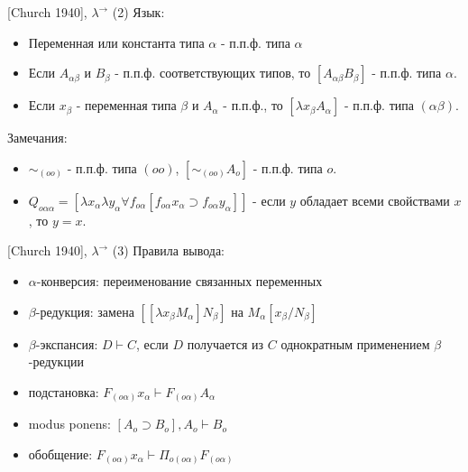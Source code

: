 \documentclass{beamer}
\begin{document}
\begin{frame}{[Church 1940], $\lambda^\to$ (2)}
Язык:\\
\bigskip
\begin{itemize}
  \item Переменная или константа типа $\alpha$ - п.п.ф. типа $\alpha$ 
  \item Если $A_{\alpha\beta}$ и $B_{\beta}$ - п.п.ф. соответствующих типов, то $[A_{\alpha\beta}B_\beta]$ - п.п.ф. типа $\alpha$.
  \item Если $x_\beta$ - переменная типа $\beta$ и $A_\alpha$ - п.п.ф., то $[\lambda x_\beta A_\alpha]$ - п.п.ф. типа $(\alpha \beta)$.
\end{itemize}
\bigskip
Замечания:\\
\begin{itemize}
  \item $\sim_{(oo)}$ - п.п.ф. типа $(oo)$, $[\sim_{(oo)}A_o]$ - п.п.ф. типа $o$.
  \item $Q_{o \alpha \alpha} = [\lambda x_\alpha \lambda y_\alpha \forall f_{o \alpha}[f_{o \alpha} x_\alpha \supset f_{o \alpha} y_\alpha]]$ - если $y$ обладает всеми свойствами $x$, то $y = x$.
\end{itemize}
\end{frame}

\begin{frame}{[Church 1940], $\lambda^\to$ (3)}
Правила вывода:\\
\bigskip
\begin{itemize}
  \item $\alpha$-конверсия: переименование связанных переменных
  \item $\beta$-редукция: замена $[[\lambda x_\beta M_\alpha] N_\beta]$ на $M_\alpha[x_\beta/N_\beta]$
  \item $\beta$-экспансия: $D \vdash C$, если $D$ получается из $C$ однократным применением $\beta$-редукции
  \item подстановка: $F_{(o \alpha)} x_\alpha \vdash F_{(o \alpha)} A_\alpha$
  \item modus ponens: $[A_o \supset B_o], A_o \vdash B_o$ 
  \item обобщение: $F_{(o \alpha)} x_\alpha \vdash \Pi_{o (o \alpha)} F_{(o \alpha)}$
\end{itemize}
\end{frame}
\end{document}
